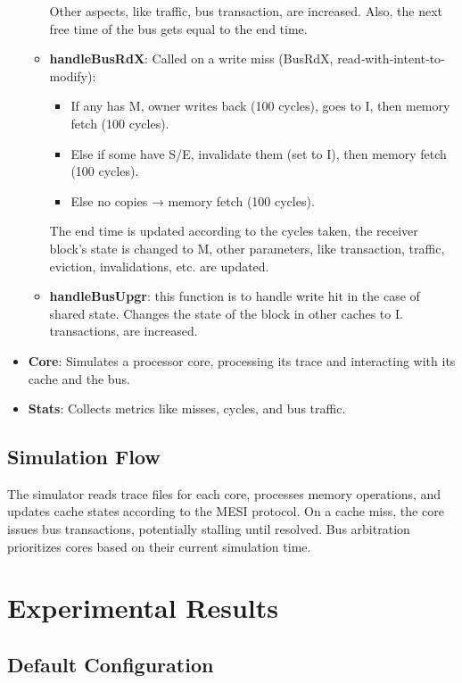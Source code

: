 \documentclass{article}
\begin{document}
\begin{itemize}
\begin{itemize}
\begin{itemize}
        \end{itemize}
        Other aspects, like traffic, bus transaction, are increased. Also, the next free time of the bus gets equal to the end time.
        \item \textbf{handleBusRdX}: Called on a write miss (BusRdX, read‐with‐intent‐to‐modify):
        \begin{itemize}
            \item If any has M, owner writes back (100 cycles), goes to I, then memory fetch (100 cycles).
            \item Else if some have S/E, invalidate them (set to I), then memory fetch (100 cycles).
            \item Else no copies → memory fetch (100 cycles).
        \end{itemize}
        The end time is updated according to the cycles taken, the receiver block's state is changed to M, other parameters, like transaction, traffic, eviction, invalidations, etc. are updated.
        \item \textbf{handleBusUpgr}: this function is to handle write hit in the case of shared state. Changes the state of the block in other caches to I.  transactions, are increased.
    \end{itemize}
    \item \textbf{Core}: Simulates a processor core, processing its trace and interacting with its cache and the bus.
    \item \textbf{Stats}: Collects metrics like misses, cycles, and bus traffic.
    
\end{itemize}

\subsection{Simulation Flow}

The simulator reads trace files for each core, processes memory operations, and updates cache states according to the MESI protocol. On a cache miss, the core issues bus transactions, potentially stalling until resolved. Bus arbitration prioritizes cores based on their current simulation time.

\section{Experimental Results}

\subsection{Default Configuration}
\end{document}
